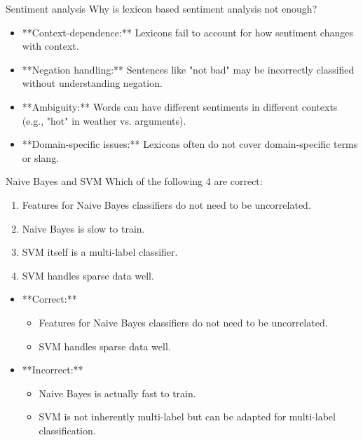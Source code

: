 \documentclass{article}
\begin{document}
\begin{exercise}{Sentiment analysis}
  Why is lexicon based sentiment analysis not enough?

  \begin{solution}
    \begin{itemize}
        \item **Context-dependence:** Lexicons fail to account for how sentiment changes with context.
        \item **Negation handling:** Sentences like "not bad" may be incorrectly classified without understanding negation.
        \item **Ambiguity:** Words can have different sentiments in different contexts (e.g., "hot" in weather vs. arguments).
        \item **Domain-specific issues:** Lexicons often do not cover domain-specific terms or slang.
    \end{itemize}
  \end{solution}
\end{exercise}

\begin{exercise}{Naive Bayes and SVM}
  Which of the following 4 are correct:
  \begin{enumerate}
    \item Features for Naive Bayes classifiers do not need to be uncorrelated.
    \item Naive Bayes is slow to train.
    \item SVM itself is a multi-label classifier.
    \item SVM handles sparse data well.
  \end{enumerate}

  \begin{solution}
    \begin{itemize}
        \item **Correct:** 
        \begin{itemize}
            \item Features for Naive Bayes classifiers do not need to be uncorrelated.
            \item SVM handles sparse data well.
        \end{itemize}
        \item **Incorrect:**
        \begin{itemize}
            \item Naive Bayes is actually fast to train.
            \item SVM is not inherently multi-label but can be adapted for multi-label classification.
        \end{itemize}
    \end{itemize}
  \end{solution}
\end{exercise}
\end{document}
